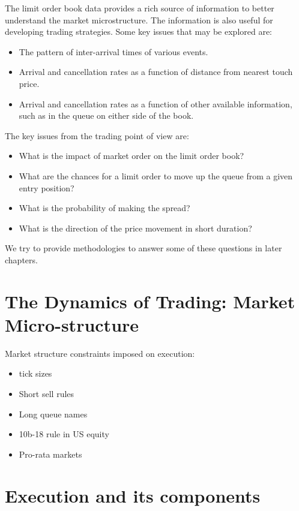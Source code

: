 The limit order book data provides a rich source of information to better understand the market microstructure. The information is also useful for developing trading strategies. Some key issues that may be explored are:
        \begin{itemize}
        \item The pattern of inter-arrival times of various events.
        \item Arrival and cancellation rates as a function of distance from nearest touch price.
        \item Arrival and cancellation rates as a function of other available information, such as in the queue on either side of the book.
        \end{itemize}
The key issues from the trading point of view are:
        \begin{itemize}
        \item What is the impact of market order on the limit order book?
        \item What are the chances for a limit order to move up the queue from a given entry position?
        \item What is the probability of making the spread?
        \item What is the direction of the price movement in short duration?
        \end{itemize}

We try to provide methodologies to answer some of these questions in later chapters.



\section{The Dynamics of Trading: Market Micro-structure}

Market structure constraints imposed on execution:

\begin{itemize}
\item tick sizes
\item Short sell rules
\item Long queue names
\item 10b-18 rule in US equity
\item Pro-rata markets
\end{itemize}

\section{Execution and its components}
